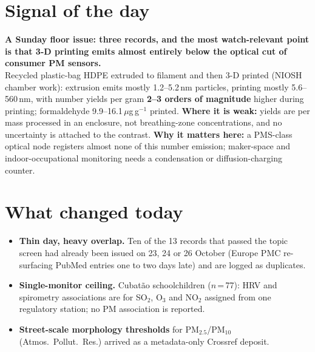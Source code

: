 \documentclass[10pt]{article}
\begin{document}
\vspace{6mm}

\section*{\sffamily\bfseries\color{Deep}Signal of the day}
\vspace{-1.5mm}{\color{Amber}\rule{\linewidth}{1.1pt}}\vspace{2.5mm}

\begin{keybox}
{\sffamily\bfseries\small\color{Deep}A Sunday floor issue: three records, and the most watch-relevant
point is that 3-D printing emits almost entirely below the optical cut of consumer PM sensors.}\\[1.4mm]
\footnotesize
Recycled plastic-bag HDPE extruded to filament and then 3-D printed (NIOSH chamber work): extrusion emits mostly
1.2--5.2\,nm particles, printing mostly 5.6--560\,nm, with number yields per gram \textbf{2--3 orders of magnitude}
higher during printing; formaldehyde 9.9--16.1\,$\mu$g\,g$^{-1}$ printed.
\textbf{Where it is weak:} yields are per mass processed in an enclosure, not breathing-zone concentrations, and
no uncertainty is attached to the contrast.
\textbf{Why it matters here:} a PMS-class optical node registers almost none of this number emission; maker-space
and indoor-occupational monitoring needs a condensation or diffusion-charging counter.\par
\end{keybox}

\vspace{3mm}

\section*{\sffamily\bfseries\color{Deep}What changed today}
\vspace{-1.5mm}{\color{Amber}\rule{\linewidth}{1.1pt}}\vspace{2.5mm}

\footnotesize
\begin{itemize}

\item \textbf{Thin day, heavy overlap.} Ten of the 13 records that passed the topic screen had already been issued on
23, 24 or 26 October (Europe PMC re-surfacing PubMed entries one to two days late) and are logged as duplicates.

\item \textbf{Single-monitor ceiling.} Cubat\~ao schoolchildren ($n$\,=\,77): HRV and spirometry associations are for
SO$_2$, O$_3$ and NO$_2$ assigned from one regulatory station; no PM association is reported.

\item \textbf{Street-scale morphology thresholds} for PM$_{2.5}$/PM$_{10}$ (Atmos.\ Pollut.\ Res.) arrived as a
metadata-only Crossref deposit.

\end{itemize}
\end{document}
